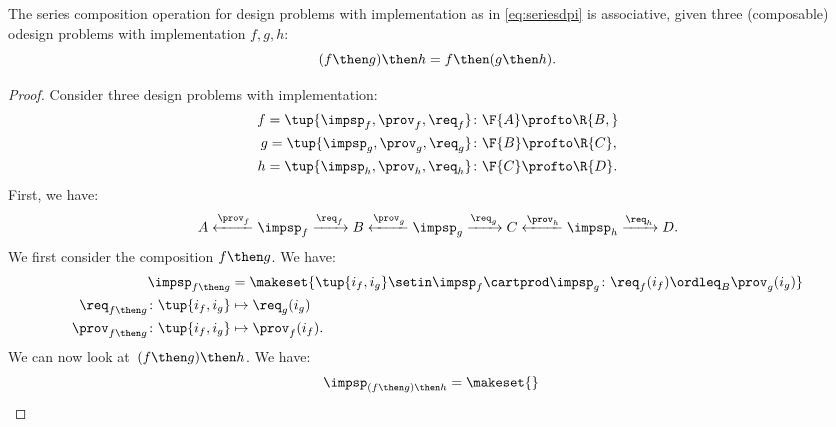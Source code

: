 {    \begin{lemma}
        The series composition operation for design problems with implementation as in \cref{eq:seriesdpi} is associative, \ie  given three (composable) odesign problems with implementation $f,g,h$:
        \begin{equation}
            (f\then g)
            \then h = f\then (g\then h).
        \end{equation}
    \end{lemma}
    \begin{proof}
        Consider three design problems with implementation:
        \begin{equation}
            \begin{aligned}
                f=\tup{{\impsp_f, \prov_f, \req_f} } & \colon \F{A} \profto\R{B,} \\
                g=\tup{\impsp_g, \prov_g, \req_g}    & \colon \F{B} \profto \R{C}, \\
                h=\tup{\impsp_h, \prov_h, \req_h}    & \colon \F{C} \profto \R{D}.
            \end{aligned}
        \end{equation}
        First, we have:
        \begin{equation}
            A \xleftarrow{\prov_f} \impsp_f \xrightarrow{\req_f} B
            \xleftarrow{\prov_g} \impsp_g \xrightarrow{\req_g} C
            \xleftarrow{\prov_h} \impsp_h \xrightarrow{\req_h} D.
        \end{equation}
        We first consider the composition $f\then g$.
        We have:
        \begin{equation}
            \begin{aligned}
                \impsp_{f\then g}                       & = \makeset{
                    \tup{i_f,i_g} \setin \impsp_f \cartprod \impsp_g \colon
                    \req_f(i_f) \ordleq_{B} \prov_g(i_g)
                } \\
                \req_{f\then g}  \colon  \tup{i_f,i_g}  & \mapsto \req_g(i_g) \\
                \prov_{f\then g}  \colon  \tup{i_f,i_g} & \mapsto \prov_f(i_f).
            \end{aligned}
        \end{equation}
        We can now look at~$(f\then g)\then h$.
        We have:
        \begin{equation}
            \begin{aligned}
                 & \impsp_{(f\then g)\then h} = \makeset{
}
\end{aligned}
\end{equation}
\end{proof}}
